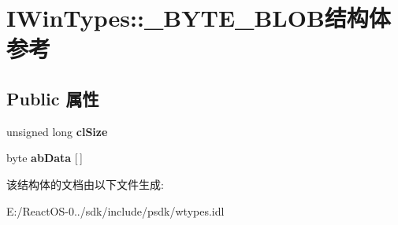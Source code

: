 \hypertarget{struct_i_win_types_1_1___b_y_t_e___b_l_o_b}{}\section{I\+Win\+Types\+:\+:\+\_\+\+B\+Y\+T\+E\+\_\+\+B\+L\+O\+B结构体 参考}
\label{struct_i_win_types_1_1___b_y_t_e___b_l_o_b}
\subsection*{Public 属性}
\begin{DoxyCompactItemize}
\item 
\mbox{\label{struct_i_win_types_1_1___b_y_t_e___b_l_o_b_aec9743fdab4380368434dd5283f29600}} 
unsigned long {\bfseries cl\+Size}
\item 
\mbox{\label{struct_i_win_types_1_1___b_y_t_e___b_l_o_b_a95d14711415b5e8a1c0a02d53abe9d95}} 
byte {\bfseries ab\+Data} \mbox{[}$\,$\mbox{]}
\end{DoxyCompactItemize}


该结构体的文档由以下文件生成\+:\begin{DoxyCompactItemize}
\item 
E\+:/\+React\+O\+S-\/0../sdk/include/psdk/wtypes.\+idl\end{DoxyCompactItemize}
